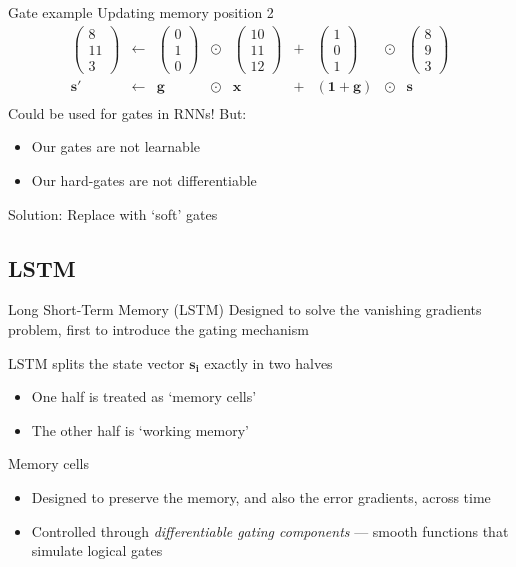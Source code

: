 \documentclass[12pt,aspectratio=169,handout]{beamer}
\begin{document}
\begin{frame}{Gate example}
Updating memory position 2
$$
\begin{aligned}
	\begin{pmatrix}
		8 \\ 11 \\ 3
	\end{pmatrix}
	&\gets
	&\begin{pmatrix}
		0 \\ 1 \\ 0
	\end{pmatrix}
	&
	\odot
	&\begin{pmatrix}
		10 \\ 11 \\ 12
	\end{pmatrix}
	&+
	&\begin{pmatrix}
		1 \\ 0 \\ 1
	\end{pmatrix}
	&\odot
	&\begin{pmatrix}
		8 \\ 9 \\ 3
	\end{pmatrix}
	\\
	\bm{s'} &\gets &\bm{g} &\odot &\bm{x} &+ &(\bm{1} + \bm{g}) &\odot &\bm{s} \\
\end{aligned}
$$
\pause
Could be used for gates in RNNs! But:
\begin{itemize}
	\item Our gates are not learnable
	\item Our hard-gates are not differentiable
\end{itemize}
Solution: Replace with `soft' gates
\end{frame}

\subsection{LSTM}

\begin{frame}{Long Short-Term Memory (LSTM)}
Designed to solve the vanishing gradients problem, first to introduce the gating mechanism

\pause
LSTM splits the state vector $\bm{s_i}$ exactly in two halves
\begin{itemize}
	\item One half is treated as `memory cells'
	\item The other half is `working memory'
\end{itemize}

\pause
\begin{block}{Memory cells}
	\begin{itemize}
		\item Designed to preserve the memory, and also the error gradients, across time
		\item Controlled through \emph{differentiable gating components} --- smooth functions that simulate logical gates
	\end{itemize}
\end{block}


\end{frame}
\end{document}
